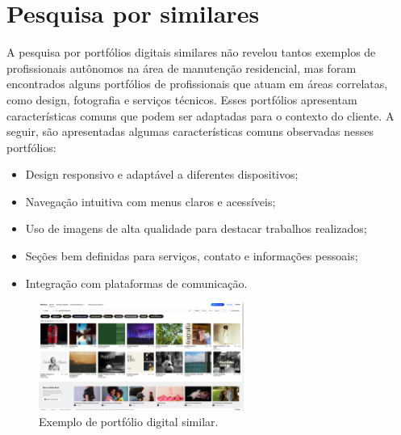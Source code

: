 


\section{Pesquisa por similares}

A pesquisa por portfólios digitais similares não revelou tantos exemplos de profissionais autônomos na área de manutenção residencial, mas foram encontrados alguns portfólios de profissionais que atuam em áreas correlatas, como design, fotografia e serviços técnicos. Esses portfólios apresentam características comuns que podem ser adaptadas para o contexto do cliente.
A seguir, são apresentadas algumas características comuns observadas nesses portfólios:
\begin{itemize}
    \item Design responsivo e adaptável a diferentes dispositivos;
    \item Navegação intuitiva com menus claros e acessíveis;
    \item Uso de imagens de alta qualidade para destacar trabalhos realizados;
    \item Seções bem definidas para serviços, contato e informações pessoais;
    \item Integração com plataformas de comunicação.
\end{itemize}

\begin{figure}[H]
    \centering
    \includegraphics[width=0.6\textwidth]{Figures/foto.png} %
    \caption{Exemplo de portfólio digital similar.}
    \label{fig:exemplo1-portfolio}
\end{figure}


